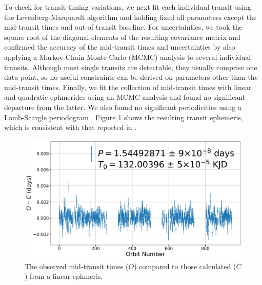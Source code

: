 \documentclass[manuscript]{aastex62}
\begin{document}
To check for transit-timing variations, we next fit each individual transit using the Levenberg-Marquardt algorithm and holding fixed all parameters except the mid-transit times and out-of-transit baseline. For uncertainties, we took the square root of the diagonal elements of the resulting covariance matrix \citep{} and confirmed the accuracy of the mid-transit times and uncertainties by also applying a Markov-Chain Monte-Carlo (MCMC) analysis \citep{2013PASP..125..306F} to several individual transits. Although most single transits are detectable, they usually comprise one data point, so no useful constraints can be derived on parameters other than the mid-transit times. Finally, we fit the collection of mid-transit times with linear and quadratic ephmerides using an MCMC analysis and found no significant departure from the latter. We also found no significant periodicities using a Lomb-Scargle periodogram \citep{1976Ap&SS..39..447L, 1982ApJ...263..835S}. Figure \ref{fig:TTVs_Analysis_of_Kepler76b} shows the resulting transit ephemeris, which is consistent with that reported in \citet{2013ApJ...771...26F}.

\begin{figure}
    \includegraphics[width=\textwidth]{TTVs_Analysis_of_Kepler76b.png}
    \caption{The observed mid-transit times ($O$) compared to those calculated ($C$) from a linear ephmeris.}
    \label{fig:TTVs_Analysis_of_Kepler76b}
\end{figure}
\end{document}
